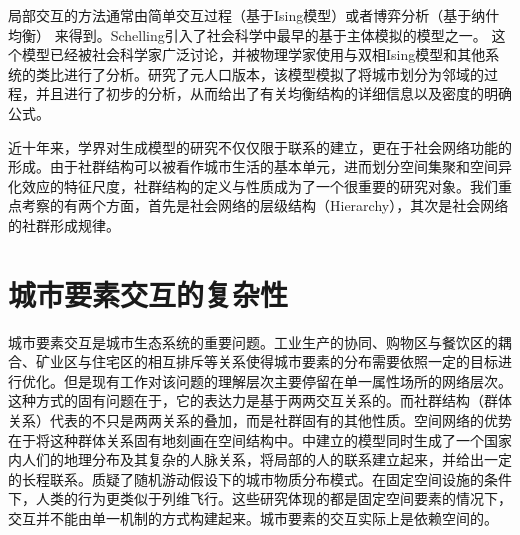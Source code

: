 局部交互的方法通常由简单交互过程（基于Ising模型）或者博弈分析（基于纳什均衡）\cite{grimalda2016social,Mussa2019Urbanity} 来得到。Schelling引入了社会科学中最早的基于主体模拟的模型之一。 这个模型已经被社会科学家广泛讨论，并被物理学家使用与双相Ising模型和其他系统的类比进行了分析。\cite{Durrett14036}研究了元人口版本，该模型模拟了将城市划分为邻域的过程，并且进行了初步的分析，从而给出了有关均衡结构的详细信息以及密度的明确公式。

近十年来，学界对生成模型的研究不仅仅限于联系的建立，更在于社会网络功能的形成。由于社群结构可以被看作城市生活的基本单元，进而划分空间集聚和空间异化效应的特征尺度，社群结构的定义与性质成为了一个很重要的研究对象。我们重点考察的有两个方面，首先是社会网络的层级结构（Hierarchy），其次是社会网络的社群形成规律。



\section{城市要素交互的复杂性}

城市要素交互是城市生态系统的重要问题\cite{duneier1999talking}。工业生产的协同、购物区与餐饮区的耦合、矿业区与住宅区的相互排斥等关系使得城市要素的分布需要依照一定的目标进行优化。但是现有工作对该问题的理解层次主要停留在单一属性场所的网络层次。这种方式的固有问题在于，它的表达力是基于两两交互关系的。而社群结构（群体关系）代表的不只是两两关系的叠加，而是社群固有的其他性质\cite{durrett2019probability}。空间网络的优势在于将这种群体关系固有地刻画在空间结构中。\cite{PhysRevX.4.011008}中建立的模型同时生成了一个国家内人们的地理分布及其复杂的人脉关系，将局部的人的联系建立起来，并给出一定的长程联系。\cite{PhysRevLett.123.208002}质疑了随机游动假设下的城市物质分布模式。在固定空间设施的条件下，人类的行为更类似于列维飞行。这些研究体现的都是固定空间要素的情况下，交互并不能由单一机制的方式构建起来。城市要素的交互实际上是依赖空间的。

